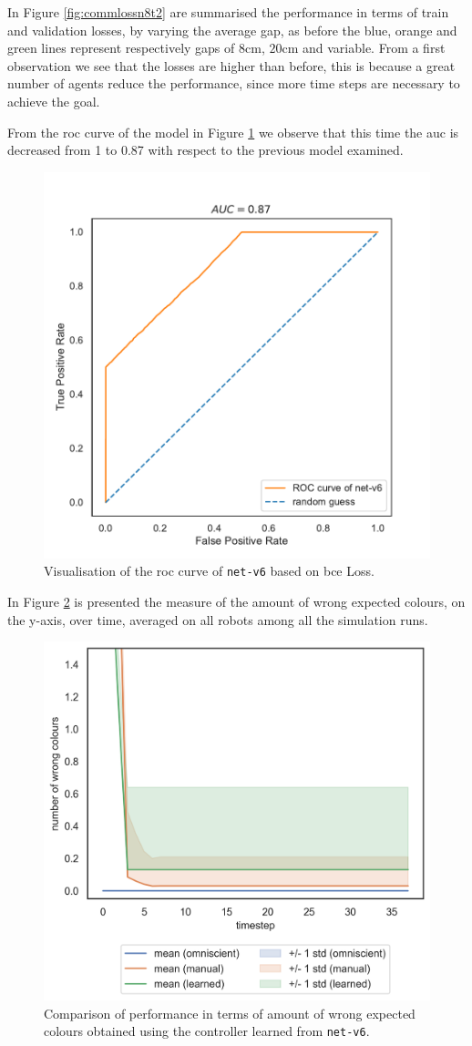 \noindent
In Figure \ref{fig:commlossn8t2} are summarised the performance in terms of 
train and validation losses, by varying the average gap, as before the blue, orange 
and green lines represent respectively gaps of $8$\gls{cm}, $20$\gls{cm} and 
variable. 
From a first observation we see that the losses are higher than before, this is 
because a great number of agents reduce the performance, since more time steps 
are necessary to achieve the goal.

From the \gls{roc} curve of the model in Figure \ref{fig:net-v6auc} we observe 
that this time the \gls{auc} is decreased from 1 to 0.87 with respect to the 
previous model examined. 
\begin{figure}[!htb]
	\centering
	\includegraphics[width=.5\textwidth]{contents/images/net-v6/roc-net-v6(a)}%
	\caption[Evaluation of the \gls{roc} of \texttt{net-v6}.]{Visualisation of the 
		\gls{roc} curve of \texttt{net-v6} based on \gls{bce} Loss.}
	\label{fig:net-v6auc}
\end{figure}

In Figure \ref{fig:net-v6error} is presented the measure of the amount of wrong 
expected colours, on the y-axis, over time, averaged on all robots among all the 
simulation runs. 
\begin{figure}[!htb]
	\centering
	\includegraphics[width=.5\textwidth]{contents/images/net-v6/colours-errors-compressed}%
	\caption[Evaluation of \texttt{net-v6} amount of wrong expected 
	colours.]{Comparison of performance in terms of amount of wrong expected 
		colours obtained using the controller learned from \texttt{net-v6}.}
	\label{fig:net-v6error}
\end{figure}

